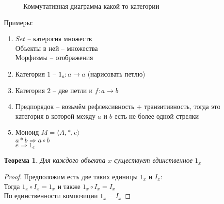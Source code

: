 \documentclass[a4paper, fleqn, draft]{report}
\newtheorem*{thm}{Теорема}
\begin{document}
\begin{figure}
  \centering

  \caption{Коммутативная диаграмма какой-то категории}
  \label{fig:cd1}
\end{figure}
Примеры:
\begin{enumerate}
  \item $Set$ -- катерогия множеств \\
        Объекты в ней -- множества \\
        Морфизмы -- отображения
  \item Категория $1$ -- $1_a\colon a \to a$ (нарисовать петлю) 
  \item Категория $2$ -- две петли и $f\colon a \to b$
  \item Предпорядок -- возьмём рефлексивность + транзитивность, тогда это категория
                       в которой между $a$ и $b$ есть не более одной стрелки
  \item Моноид $M = \langle A, *, e \rangle$ \\
        $a * b \Rightarrow a \circ b$ \\
        $e \Rightarrow 1_e$
\end{enumerate}



\begin{thm}
  Для каждого объекта $x$ существует единственное $1_x$
\end{thm}
\begin{proof}
  Предположим есть две таких единицы $1_x$ и $I_x$: \\
  Тогда $1_x \circ I_x = 1_x$ и также $1_x \circ I_x = I_x$ \\
  По единственности композиции $1_x = I_x$
\end{proof}
\end{document}
